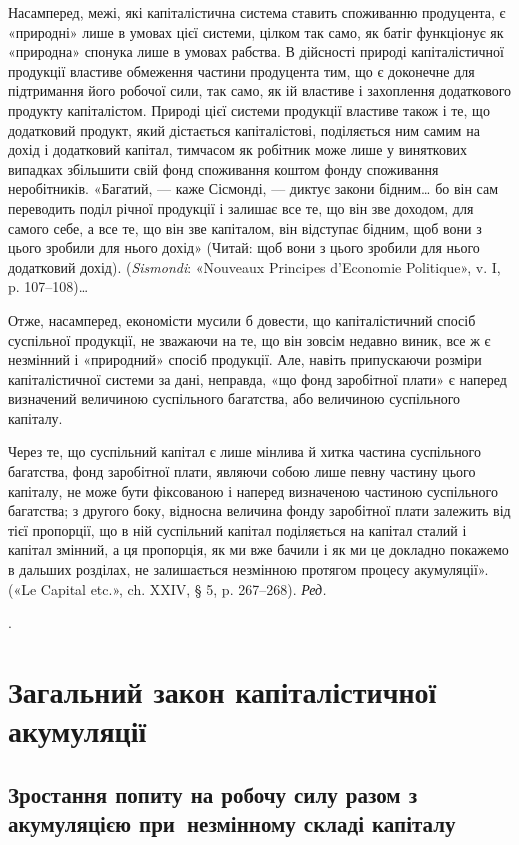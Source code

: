 {Насамперед, межі, які капіталістична система ставить споживанню
продуцента, є «природні» лише в умовах цієї системи, цілком так
само, як батіг функціонує як «природна» спонука лише в умовах рабства.
В дійсності природі капіталістичної продукції властиве обмеження
частини продуцента тим, що є доконечне для підтримання його робочої
сили, так само, як ій властиве і захоплення додаткового продукту
капіталістом. Природі цієї системи продукції властиве також і те, що
додатковий продукт, який дістається капіталістові, поділяється ним
самим на дохід і додатковий капітал, тимчасом як робітник може лише
у виняткових випадках збільшити свій фонд споживання коштом фонду
споживання неробітників. «Багатий, — каже Сісмонді, — диктує закони
бідним\dots{} бо він сам переводить поділ річної продукції і залишає все
те, що він зве доходом, для самого себе, а все те, що він зве капіталом,
він відступає бідним, щоб вони з цього зробили для нього дохід» (Читай:
щоб вони з цього зробили для нього додатковий дохід). (\emph{Sismondi}: «Nouveaux
Principes d’Economie Politique», v. I, p. 107--108)\dots{}

Отже, насамперед, економісти мусили б довести, що капіталістичний
спосіб суспільної продукції, не зважаючи на те, що він зовсім
недавно виник, все ж є незмінний і «природний» спосіб продукції. Але,
навіть припускаючи розміри капіталістичної системи за дані, неправда,
«що фонд заробітної плати» є наперед визначений величиною суспільного
багатства, або величиною суспільного капіталу.

Через те, що суспільний капітал є лише мінлива й хитка частина
суспільного багатства, фонд заробітної плати, являючи собою лише
певну частину цього капіталу, не може бути фіксованою і наперед визначеною
частиною суспільного багатства; з другого боку, відносна величина
фонду заробітної плати залежить від тієї пропорції, що в ній суспільний
капітал поділяється на капітал сталий і капітал змінний, а ця
пропорція, як ми вже бачили і як ми це докладно покажемо в дальших
розділах, не залишається незмінною протягом процесу акумуляції».
(«Le Capital etc.», ch. XXIV, § 5, p. 267--268). \emph{Ред.}
}.


\section{Загальний закон капіталістичної акумуляції}

\subsection{Зростання попиту на робочу силу разом з акумуляцією
при~незмінному складі капіталу}

